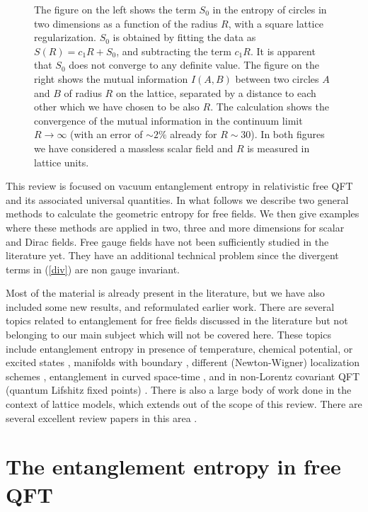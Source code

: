 \documentclass[11pt]{article}
\begin{document}
\begin{figure} [tbp]
\leavevmode
\centering
\epsfxsize=15.8cm
\bigskip
{}
\caption{The figure on the left shows the term $S_0$ in the entropy of circles in two dimensions as a function of the  radius $R$, with a square lattice regularization. $S_0$ is obtained by fitting the data as $S(R)=c_1 R+ S_0$, and subtracting the term $c_1 R$. It is apparent that $S_0$ does not converge to any definite value. The figure on the right shows the mutual information $I(A,B)$ between two circles $A$ and $B$ of radius $R$ on the lattice, separated by a distance to each other which we have chosen to be also $R$. The calculation shows the convergence of the mutual information in the continuum limit $R\rightarrow\infty$ (with an error of $\sim 2\%$ already for $R\sim 30$). In both figures we have considered a massless scalar field and  $R$ is measured in lattice units. }
\label{figu0}
\end{figure}

This review is focused on vacuum entanglement entropy in relativistic free QFT and its associated universal quantities.  In what follows we describe two general methods to calculate the geometric entropy for free fields. We then give examples where these methods are applied in two, three and more dimensions for scalar and Dirac fields. Free gauge fields have not been sufficiently studied in the literature yet. They have an additional technical problem since the divergent terms in (\ref{div}) are non gauge invariant. 

Most of the material is already present in the literature, but we have also included some new results, and reformulated earlier work.  
There are several topics related to entanglement for free fields discussed in the literature but not belonging to our main subject which will not be covered here. These topics include entanglement entropy in presence of  temperature, chemical potential, or excited states \cite{cc,fermionic1,kor,otrosfermionic}, manifolds with boundary \cite{frolovangulo,dc,sh,met}, different (Newton-Wigner) localization schemes \cite{nw}, entanglement in curved space-time \cite{dos,ii}, and in non-Lorentz covariant QFT (quantum Lifshitz fixed points) \cite{frad}. There is also a large body of work done in the context of lattice models, which extends out of the scope of this review. There are several excellent review papers in this area \cite{ami,ecp,pesc}.   

\section{The entanglement entropy in free QFT}
\end{document}
